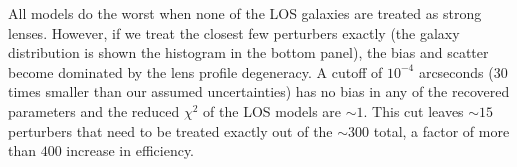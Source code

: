 All models do the worst when none of the LOS galaxies are treated as strong lenses. However, if we treat the closest few perturbers exactly (the galaxy distribution is shown the histogram in the bottom panel), the bias and scatter become dominated by the lens profile degeneracy. A cutoff of $10^{-4}$ arcseconds (30 times smaller than our assumed uncertainties) has no bias in any of the recovered parameters and the reduced $\chi^2$ of the LOS models are $\sim 1$. This cut leaves $\sim 15$ perturbers that need to be treated exactly out of the $\sim 300$ total, a factor of more than $400$ increase in efficiency.
  
  
  